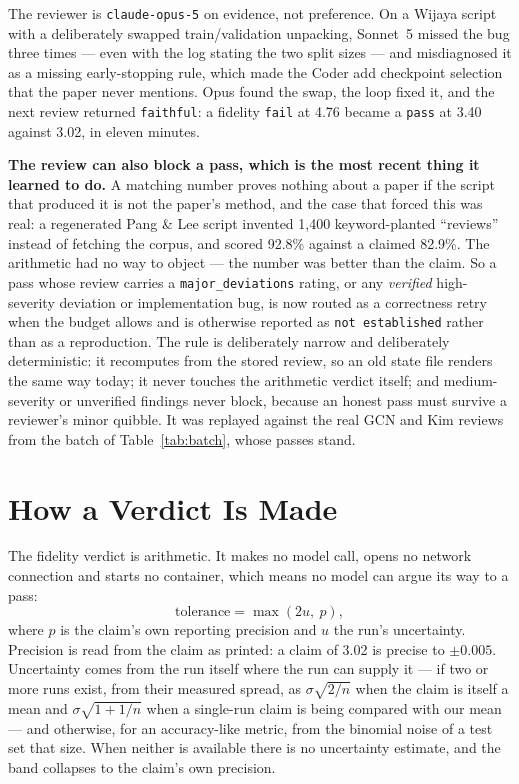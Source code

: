 \documentclass[10pt,twocolumn]{article}
\begin{document}
The reviewer is \texttt{claude-opus-5} on evidence, not preference. On a Wijaya script with a
deliberately swapped train/validation unpacking, Sonnet~5 missed the bug three times --- even with
the log stating the two split sizes --- and misdiagnosed it as a missing early-stopping rule,
which made the Coder add checkpoint selection that the paper never mentions. Opus found the swap,
the loop fixed it, and the next review returned \texttt{faithful}: a fidelity \texttt{fail} at
4.76 became a \texttt{pass} at 3.40 against 3.02, in eleven minutes.

\textbf{The review can also block a pass, which is the most recent thing it learned to do.} A
matching number proves nothing about a paper if the script that produced it is not the paper's
method, and the case that forced this was real: a regenerated Pang \& Lee script invented 1,400
keyword-planted ``reviews'' instead of fetching the corpus, and scored 92.8\% against a claimed
82.9\%. The arithmetic had no way to object --- the number was better than the claim. So a pass
whose review carries a \texttt{major\_deviations} rating, or any \emph{verified} high-severity
deviation or implementation bug, is now routed as a correctness retry when the budget allows and
is otherwise reported as \texttt{not established} rather than as a reproduction. The rule is
deliberately narrow and deliberately deterministic: it recomputes from the stored review, so an
old state file renders the same way today; it never touches the arithmetic verdict itself; and
medium-severity or unverified findings never block, because an honest pass must survive a
reviewer's minor quibble. It was replayed against the real GCN and Kim reviews from the batch of
Table~\ref{tab:batch}, whose passes stand.

\section{How a Verdict Is Made}
\label{sec:verdict}

The fidelity verdict is arithmetic. It makes no model call, opens no network connection and starts
no container, which means no model can argue its way to a pass:
\[
  \text{tolerance} = \max(2u,\ p),
\]
where $p$ is the claim's own reporting precision and $u$ the run's uncertainty. Precision is read
from the claim as printed: a claim of 3.02 is precise to $\pm 0.005$. Uncertainty comes from the
run itself where the run can supply it --- if two or more runs exist,
from their measured spread, as $\sigma\sqrt{2/n}$ when the claim is itself a mean and
$\sigma\sqrt{1 + 1/n}$ when a single-run claim is being compared with our mean --- and otherwise,
for an accuracy-like metric, from the binomial noise of a test set that size. When neither is
available there is no uncertainty estimate, and the band collapses to the claim's own precision.
\end{document}
